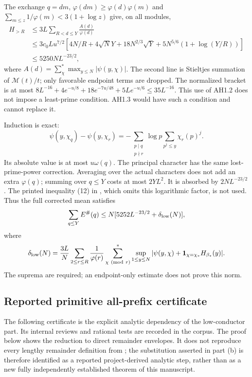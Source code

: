\documentclass[11pt,a4paper]{article}
\theoremstyle{definition}
\theoremstyle{remark}
\begin{document}
The exchange $q=dm$, $\varphi(dm)\geq\varphi(d)\varphi(m)$ and
$\sum_{m\leq z}1/\varphi(m)<3(1+\log z)$ give, on all modules,
\begin{align*}
 H_{>R}&\leq3L\sum_{R<d\leq Y}\frac{A(d)}{\varphi(d)}\\
 &\leq3c_0Lu^{7/2}
 [4N/R+4\sqrt N Y+18N^{2/3}\sqrt Y
                         +5N^{5/6}(1+\log(Y/R))]\\
 &\leq5250NL^{-23/2},
\end{align*}
where $A(d)=\sum_\chi^*\max_{y\leq N}|\psi(y,\chi)|$.
The second line is Stieltjes summation of $\mathcal M(t)/t$; only
favorable endpoint terms are dropped. The normalized bracket is at
most $8L^{-16}+4e^{-u/8}+18e^{-7u/48}+5Le^{-u/6}
\leq35L^{-16}$. This use of AH1.2 does not impose a least-prime
condition. AH1.3 would have such a condition and cannot replace it.

Induction is exact:
\[
 \psi(y,\chi_q)-\psi(y,\chi_r)
   =-\sum_{\substack{p\mid q\\p\nmid r}}\log p
                  \sum_{p^j\leq y}\chi_r(p)^j.
\]
Its absolute value is at most $u\omega(q)$. The principal character
has the same lost-prime-power correction. Averaging over the actual
characters does not add an extra $\varphi(q)$; summing over $q\leq Y$
costs at most $2YL^2$. It is absorbed by $2NL^{-23/2}$.
The printed inequality (12) in \cite{Bordignon}, which omits this
logarithmic factor, is not used. Thus the full corrected mean satisfies
\begin{equation}\label{eq:ext-mean}
 \sum_{q\leq Y}E^\#(q)
 \leq N[5252L^{-23/2}+\delta_{\rm low}(N)],
\end{equation}
where
\[
 \delta_{\rm low}(N)=\frac{3L}{N}
 \sum_{2\leq r\leq R}\frac1{\varphi(r)}
 \sum_{\chi\ ({\rm mod}\ r)}^*
       \sup_{1\leq y\leq N}|\psi(y,\chi)
                          +\mathbf1_{\chi=\chi_*}H_{\beta_*}(y)|.
\]
The suprema are required; an endpoint-only estimate does not prove
this norm.

\subsection{Reported primitive all-prefix certificate}

The following certificate is the explicit analytic dependency of the
low-conductor part. Its internal reviews and rational tests are recorded
in the corpus. The proof below shows the reduction to direct remainder
envelopes. It does not reproduce every lengthy remainder definition
from \cite{Bordignon}; the substitution asserted in part (b) is therefore
identified as a reported project-derived analytic step, rather than as
a new fully independently established theorem of this manuscript.
\end{document}
